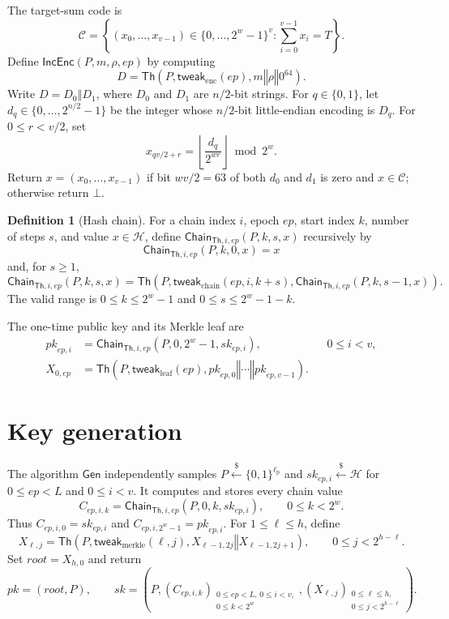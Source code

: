 \documentclass[11pt]{article}
\theoremstyle{definition}
\newtheorem{definition}{Definition}[section]
\theoremstyle{plain}
\theoremstyle{remark}
\newcommand{\bits}[1]{\{0,1\}^{#1}}
\newcommand{\getsr}{\stackrel{\$}{\gets}}
\newcommand{\Th}{\mathsf{Th}}
\newcommand{\IncEnc}{\mathsf{IncEnc}}
\newcommand{\Gen}{\mathsf{Gen}}
\newcommand{\Chain}{\mathsf{Chain}}
\newcommand{\concat}{\mathbin\Vert}
\newcommand{\ep}{\mathit{ep}}
\newcommand{\sk}{\mathit{sk}}
\newcommand{\pk}{\mathit{pk}}
\newcommand{\rootnode}{\mathit{root}}
\newcommand{\lpar}{\ell_{\mathrm{p}}}
\begin{document}
The target-sum code is~\cite{DKKW25}
\[
  \mathcal C=\left\{(x_0,\ldots,x_{v-1})\in\{0,\ldots,2^w - 1\}^{v}:\sum_{i=0}^{v-1}x_i=T\right\}.
\]
Define $\IncEnc(P,m,\rho,\ep)$ by computing
\[
  D=\Th\!\left(P,\mathsf{tweak}_{\mathrm{enc}}(\ep),m\concat\rho\concat 0^{64}\right).
\]
Write $D=D_0\concat D_1$, where $D_0$ and $D_1$ are $n/2$-bit strings. For $q\in\{0,1\}$, let $d_q\in\{0,\ldots,2^{n/2}-1\}$ be the integer whose $n/2$-bit little-endian encoding is $D_q$. For $0\leq r<v/2$, set
\[
  x_{qv/2+r}=\left\lfloor\frac{d_q}{2^{wr}}\right\rfloor\bmod 2^w.
\]
Return $x=(x_0,\ldots,x_{v-1})$ if bit $wv/2=63$ of both $d_0$ and $d_1$ is zero and $x\in\mathcal C$; otherwise return $\bot$.

\begin{definition}[Hash chain]
For a chain index $i$, epoch $\ep$, start index $k$, number of steps $s$, and value $x\in\mathcal H$, define $\Chain_{\Th,i,\ep}(P,k,s,x)$ recursively by
\[
  \Chain_{\Th,i,\ep}(P,k,0,x)=x
\]
and, for $s\geq1$,
\[
  \Chain_{\Th,i,\ep}(P,k,s,x)=\Th\!\left(P,\mathsf{tweak}_{\mathrm{chain}}(\ep,i,k+s),\Chain_{\Th,i,\ep}(P,k,s-1,x)\right).
\]
The valid range is $0\leq k\leq2^w-1$ and $0\leq s\leq2^w-1-k$.
\end{definition}

The one-time public key and its Merkle leaf are
\[
\begin{aligned}
  \mathit{pk}_{\ep,i} &= \Chain_{\Th,i,\ep}(P,0,2^w-1,\mathit{sk}_{\ep,i}), &&0\leq i<v,\\
  X_{0,\ep} &= \Th\!\left(P,\mathsf{tweak}_{\mathrm{leaf}}(\ep),\mathit{pk}_{\ep,0}\concat\cdots\concat\mathit{pk}_{\ep,v-1}\right).
\end{aligned}
\]

\section{Key generation}

The algorithm $\Gen$ independently samples $P\getsr\bits{\lpar}$ and $\mathit{sk}_{\ep,i}\getsr\mathcal H$ for $0\leq\ep<L$ and $0\leq i<v$. It computes and stores every chain value
\[
  C_{\ep,i,k}=\Chain_{\Th,i,\ep}(P,0,k,\mathit{sk}_{\ep,i}),
  \qquad 0\leq k<2^w.
\]
Thus $C_{\ep,i,0}=\mathit{sk}_{\ep,i}$ and $C_{\ep,i,2^w-1}=\mathit{pk}_{\ep,i}$. For $1\leq\ell\leq h$, define
\[
  X_{\ell,j}=\Th\!\left(P,\mathsf{tweak}_{\mathrm{merkle}}(\ell,j),X_{\ell-1,2j}\concat X_{\ell-1,2j+1}\right),
  \qquad 0\leq j<2^{h-\ell}.
\]
Set $\rootnode=X_{h,0}$ and return
\[
  \pk=(\rootnode,P),
  \qquad
  \sk=\left(P,(C_{\ep,i,k})_{\substack{0\leq\ep<L,\,0\leq i<v,\\0\leq k<2^w}},(X_{\ell,j})_{\substack{0\leq\ell\leq h,\\0\leq j<2^{h-\ell}}}\right).
\]
\end{document}
